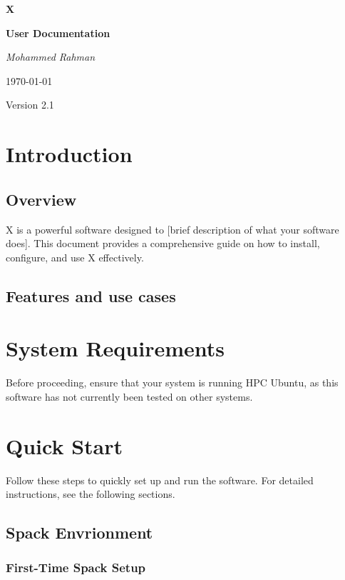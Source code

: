 \documentclass[a4paper,12pt]{article}
\begin{document}
\begin{titlepage}
    \centering
    \vspace*{2cm}
    {\Huge\bfseries X\par}
    {\Huge\bfseries User Documentation\par}
    \vspace{1.5cm}
    {\Large\itshape Mohammed Rahman\par}
    \vspace{1.5cm}
    {\large \today\par}
    \vfill
    {\large Version 2.1\par}
\end{titlepage}

\tableofcontents
\newpage

\section{Introduction}
\subsection{Overview}
X is a powerful software designed to [brief description of what your software does]. This document provides a comprehensive guide on how to install, configure, and use X effectively.

\subsection{Features and use cases}

\section{System Requirements}
Before proceeding, ensure that your system is running HPC Ubuntu, as this software has not currently been tested on other systems.

\section{Quick Start}

Follow these steps to quickly set up and run the software. For detailed instructions, see the following sections.

\subsection{Spack Envrionment}
\subsubsection{First-Time Spack Setup}
\end{document}
